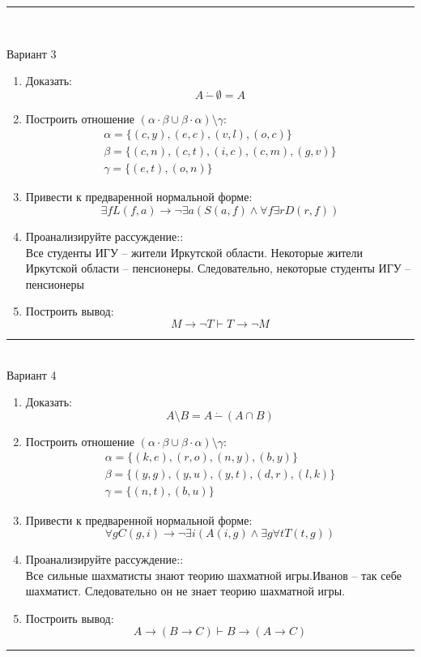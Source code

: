 \documentclass[10pt,a4paper]{article}
\begin{document}
\begin{multicols}{2}
\noindent\rule{\columnwidth}{0.1pt} \\
\columnbreak\vfill

Вариант 3
\begin{enumerate}
\item Доказать:
$$A\,\dot{-}\,\emptyset=A$$
\item Построить отношение $(\alpha\cdot\beta\cup\beta\cdot\alpha)\setminus\gamma$:
$$\begin{array}{l} \alpha=\{ (c, y), (e, c), (v, l), (o, c) \} \\ \beta=\{ (c, n), (c, t), (i, c), (c, m), (g, v) \} \\ \gamma=\{ (e, t), (o, n) \} \end{array}$$
\item Привести к предваренной нормальной форме: \:\\
$$\exists fL(f,a) \to \neg \exists a( S(a,f) \wedge \forall f\exists r D(r, f))$$
\item Проанализируйте рассуждение::\\
Все студенты ИГУ -- жители Иркутской области. Некоторые жители Иркутской области -- пенсионеры. Следовательно, некоторые студенты ИГУ -- пенсионеры
\item Построить вывод:\\
$$M \to \neg T \vdash T \to \neg M$$
\end{enumerate}
\noindent\rule{\columnwidth}{0.1pt} \\

Вариант 4
\begin{enumerate}
\item Доказать:
$$A\setminus B = A\,\dot{-}\,(A\cap B)$$
\item Построить отношение $(\alpha\cdot\beta\cup\beta\cdot\alpha)\setminus\gamma$:
$$\begin{array}{l} \alpha=\{ (k, e), (r, o), (n, y), (b, y) \} \\ \beta=\{ (y, g), (y, u), (y, t), (d, r), (l, k) \} \\ \gamma=\{ (n, t), (b, u) \} \end{array}$$
\item Привести к предваренной нормальной форме: \:\\
$$\forall gC(g,i) \to \neg \exists i( A(i,g) \wedge \exists g\forall t T(t, g))$$
\item Проанализируйте рассуждение::\\
Все сильные шахматисты знают теорию шахматной игры.Иванов -- так себе шахматист. Следовательно он не знает теорию шахматной игры.
\item Построить вывод:\\
$$A \to (B \to C) \vdash B \to (A \to C)$$
\end{enumerate}
\noindent\rule{\columnwidth}{0.1pt} \\

\end{multicols}
\end{document}
